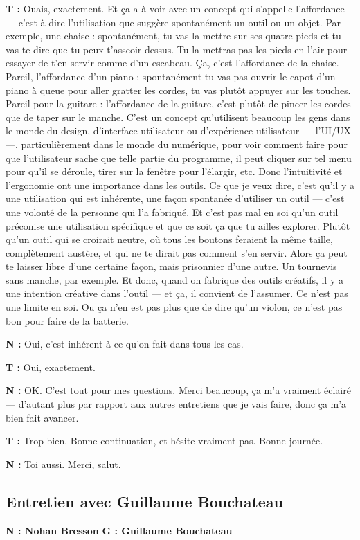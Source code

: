 ﻿\documentclass[12pt]{article}
\begin{document}
\textbf{T :} Ouais, exactement. Et ça a à voir avec un concept qui s'appelle l'affordance — c'est-à-dire l'utilisation que suggère spontanément un outil ou un objet. Par exemple, une chaise : spontanément, tu vas la mettre sur ses quatre pieds et tu vas te dire que tu peux t'asseoir dessus. Tu la mettras pas les pieds en l'air pour essayer de t'en servir comme d'un escabeau. Ça, c'est l'affordance de la chaise. Pareil, l'affordance d'un piano : spontanément tu vas pas ouvrir le capot d'un piano à queue pour aller gratter les cordes, tu vas plutôt appuyer sur les touches. Pareil pour la guitare : l'affordance de la guitare, c'est plutôt de pincer les cordes que de taper sur le manche. 
C'est un concept qu'utilisent beaucoup les gens dans le monde du design, d'interface utilisateur ou d'expérience utilisateur — l'UI/UX —, particulièrement dans le monde du numérique, pour voir comment faire pour que l'utilisateur sache que telle partie du programme, il peut cliquer sur tel menu pour qu'il se déroule, tirer sur la fenêtre pour l'élargir, etc. Donc l'intuitivité et l'ergonomie ont une importance dans les outils. 
Ce que je veux dire, c'est qu'il y a une utilisation qui est inhérente, une façon spontanée d'utiliser un outil — c'est une volonté de la personne qui l'a fabriqué. Et c'est pas mal en soi qu'un outil préconise une utilisation spécifique et que ce soit ça que tu ailles explorer. Plutôt qu'un outil qui se croirait neutre, où tous les boutons feraient la même taille, complètement austère, et qui ne te dirait pas comment s'en servir. Alors ça peut te laisser libre d'une certaine façon, mais prisonnier d'une autre. Un tournevis sans manche, par exemple. 
Et donc, quand on fabrique des outils créatifs, il y a une intention créative dans l'outil — et ça, il convient de l'assumer. Ce n'est pas une limite en soi. Ou ça n'en est pas plus que de dire qu'un violon, ce n'est pas bon pour faire de la batterie.

\textbf{N :} Oui, c'est inhérent à ce qu'on fait dans tous les cas. 

\textbf{T :} Oui, exactement. 

\textbf{N :} OK. C'est tout pour mes questions. Merci beaucoup, ça m'a vraiment éclairé — d'autant plus par rapport aux autres entretiens que je vais faire, donc ça m'a bien fait avancer. 

\textbf{T :} Trop bien. Bonne continuation, et hésite vraiment pas. Bonne journée. 

\textbf{N :} Toi aussi. Merci, salut. 


\subsection{Entretien avec Guillaume Bouchateau}
\setlength{\parindent}{0pt}
\textbf{N : Nohan Bresson 
} 
\textbf{G : Guillaume Bouchateau}  
\\
\end{document}
